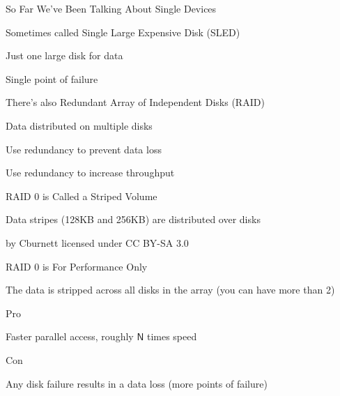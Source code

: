   \begin{frame}{So Far We've Been Talking About Single Devices}

    Sometimes called Single Large Expensive Disk (SLED)

    \hspace{2em} Just one large disk for data

    \hspace{4em} Single point of failure

    \vspace{2em}

    There's also Redundant Array of Independent Disks (RAID)

    \hspace{2em} Data distributed on multiple disks

    \hspace{4em} Use redundancy to prevent data loss

    \hspace{4em} Use redundancy to increase throughput
  \end{frame}

  \begin{frame}{RAID 0 is Called a Striped Volume}

    Data stripes (128KB and 256KB) are distributed over disks

    \begin{center}
      
    \end{center}
    
    \begin{flushright}
      by Cburnett licensed under CC BY-SA 3.0
    \end{flushright}
  \end{frame}

  \begin{frame}{RAID 0 is For Performance Only}

    The data is stripped across all disks in the array (you can have more than 2)

    \vspace{2em}

    Pro

    \hspace{2em} Faster parallel access, roughly $\mathsf{N}$ times speed

    \vspace{2em}

    Con

    \hspace{2em} Any disk failure results in a data loss (more points of failure)
  \end{frame}

